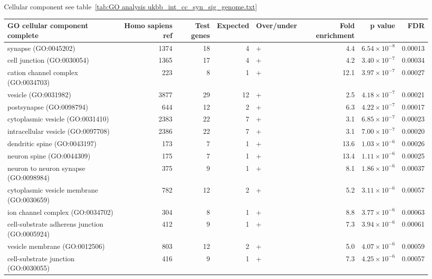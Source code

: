 Cellular component see table~\ref{tab:GO analysis ukbb_int_cc_syn_sig_genome.txt}

\begin{table}[ht]
\centering
\begin{adjustbox}{width=\textwidth}
\begin{tabular}{lrrrlrrr}
  \hline
GO cellular component complete & Homo sapiens ref & Test genes & Expected & Over/under & Fold enrichment & p value & FDR \\ 
  \hline
synapse (GO:0045202) & 1374 & 18 & 4 & + & 4.4 & $6.54 \times 10^{-8}$ & 0.00013 \\ 
  cell junction (GO:0030054) & 1365 & 17 & 4 & + & 4.2 & $3.40 \times 10^{-7}$ & 0.00034 \\ 
  cation channel complex (GO:0034703) & 223 & 8 & 1 & + & 12.1 & $3.97 \times 10^{-7}$ & 0.00027 \\ 
  vesicle (GO:0031982) & 3877 & 29 & 12 & + & 2.5 & $4.18 \times 10^{-7}$ & 0.00021 \\ 
  postsynapse (GO:0098794) & 644 & 12 & 2 & + & 6.3 & $4.22 \times 10^{-7}$ & 0.00017 \\ 
  cytoplasmic vesicle (GO:0031410) & 2383 & 22 & 7 & + & 3.1 & $6.85 \times 10^{-7}$ & 0.00023 \\ 
  intracellular vesicle (GO:0097708) & 2386 & 22 & 7 & + & 3.1 & $7.00 \times 10^{-7}$ & 0.00020 \\ 
  dendritic spine (GO:0043197) & 173 & 7 & 1 & + & 13.6 & $1.03 \times 10^{-6}$ & 0.00026 \\ 
  neuron spine (GO:0044309) & 175 & 7 & 1 & + & 13.4 & $1.11 \times 10^{-6}$ & 0.00025 \\ 
  neuron to neuron synapse (GO:0098984) & 375 & 9 & 1 & + & 8.1 & $1.86 \times 10^{-6}$ & 0.00037 \\ 
  cytoplasmic vesicle membrane (GO:0030659) & 782 & 12 & 2 & + & 5.2 & $3.11 \times 10^{-6}$ & 0.00057 \\ 
  ion channel complex (GO:0034702) & 304 & 8 & 1 & + & 8.8 & $3.77 \times 10^{-6}$ & 0.00063 \\ 
  cell-substrate adherens junction (GO:0005924) & 412 & 9 & 1 & + & 7.3 & $3.94 \times 10^{-6}$ & 0.00061 \\ 
  vesicle membrane (GO:0012506) & 803 & 12 & 2 & + & 5.0 & $4.07 \times 10^{-6}$ & 0.00059 \\ 
  cell-substrate junction (GO:0030055) & 416 & 9 & 1 & + & 7.3 & $4.25 \times 10^{-6}$ & 0.00057 \\ 

\end{tabular}
\end{adjustbox}
\end{table}
